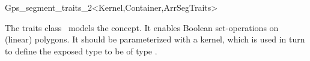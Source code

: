 \ccRefPageBegin

\begin{ccRefClass}{Gps_segment_traits_2<Kernel,Container,ArrSegTraits>}

\ccThreeToTwo

\ccDefinition
The traits class \ccRefName\ models the 
concept. It enables Boolean set-operations on (linear) polygons.
It should be parameterized with a kernel, which is used in turn to
define the exposed type  to be of type
.

 
\ccIsModel

\end{ccRefClass}
\ccRefPageEnd

